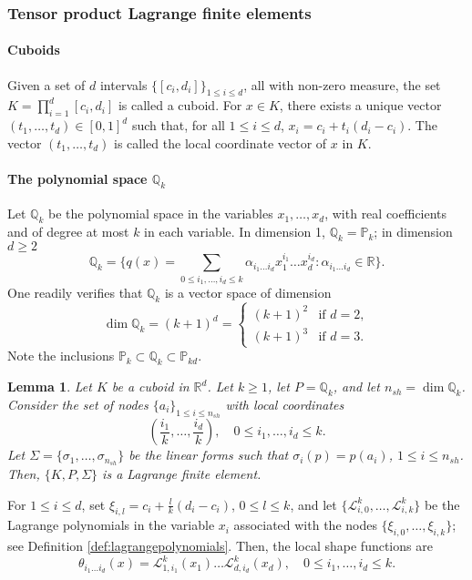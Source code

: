 \documentclass{article}
\newtheorem{lemma}{Lemma}
\begin{document}
\subsubsection{Tensor product Lagrange finite elements}
\paragraph{Cuboids}
Given a set of $d$ intervals $\{[c_i, d_i]\}_{1 \le i \le d}$, all with non-zero measure, the set $K = \prod_{i=1}^d [c_i, d_i]$ is called a cuboid. For $x \in K$, there exists a unique vector $(t_1, \dots, t_d) \in [0, 1]^d$ such that, for all $1 \le i \le d$, $x_i = c_i + t_i(d_i - c_i)$. The vector $(t_1, \dots, t_d)$ is called the local coordinate vector of $x$ in $K$.

\paragraph{The polynomial space $\mathbb{Q}_k$} Let $\mathbb{Q}_k$ be the polynomial space in the variables $x_1, \dots, x_d$, with real coefficients and of degree at most $k$ in each variable. In dimension 1, $\mathbb{Q}_k = \mathbb{P}_k$; in dimension $d \ge 2$
$$ \mathbb{Q}_k = \{ q(x) = \sum_{0 \le i_1, \dots, i_d \le k} \alpha_{i_1 \dots i_d} x_1^{i_1} \dots x_d^{i_d} : \alpha_{i_1 \dots i_d} \in \mathbb{R} \}. $$
One readily verifies that $\mathbb{Q}_k$ is a vector space of dimension
$$ \dim \mathbb{Q}_k = (k+1)^d = \begin{cases} (k+1)^2 & \text{if } d=2, \\ (k+1)^3 & \text{if } d=3. \end{cases} $$
Note the inclusions $\mathbb{P}_k \subset \mathbb{Q}_k \subset \mathbb{P}_{kd}$.

\begin{lemma}\label{lemma:tensor_product_lagrange_fe}
    Let $K$ be a cuboid in $\mathbb{R}^d$. Let $k \ge 1$, let $P = \mathbb{Q}_k$, and let $n_{sh} = \dim \mathbb{Q}_k$. Consider the set of nodes $\{a_i\}_{1 \le i \le n_{sh}}$ with local coordinates
    $$ \left(\frac{i_1}{k}, \dots, \frac{i_d}{k}\right), \quad 0 \le i_1, \dots, i_d \le k. $$
    Let $\Sigma = \{\sigma_1, \dots, \sigma_{n_{sh}}\}$ be the linear forms such that $\sigma_i(p) = p(a_i)$, $1 \le i \le n_{sh}$. Then, $\{K, P, \Sigma\}$ is a Lagrange finite element.
\end{lemma}
For $1 \le i \le d$, set $\xi_{i,l} = c_i + \frac{l}{k}(d_i - c_i)$, $0 \le l \le k$, and let $\{\mathcal{L}_{i,0}^k, \dots, \mathcal{L}_{i,k}^k\}$ be the Lagrange polynomials in the variable $x_i$ associated with the nodes $\{\xi_{i,0}, \dots, \xi_{i,k}\}$; see Definition \ref{def:lagrangepolynomials}. Then, the local shape functions are
$$ \theta_{i_1 \dots i_d}(x) = \mathcal{L}_{1,i_1}^k(x_1) \dots \mathcal{L}_{d,i_d}^k(x_d), \quad 0 \le i_1, \dots, i_d \le k. $$
\end{document}
